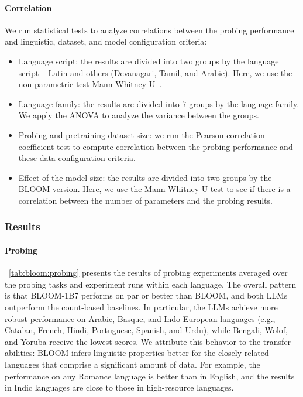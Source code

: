 \paragraph{Correlation} We run statistical tests to analyze correlations between the probing performance and linguistic, dataset, and model configuration criteria:

\begin{itemize}
    \item Language script: the results are divided into two groups by the language script -- Latin and others (Devanagari, Tamil, and Arabic). Here, we use the non-parametric test Mann-Whitney U~\citep{mann1947controlling}.
    \item Language family: the results are divided into $7$ groups by the language family. We apply the ANOVA to analyze the variance between the groups.
    \item Probing and pretraining dataset size: we run the Pearson correlation coefficient test \citep{pearson1895vii} to compute correlation between the probing performance and these data configuration criteria.
    \item Effect of the model size: the results are divided into two groups by the BLOOM version. Here, we use the Mann-Whitney U test to see if there is a correlation between the number of parameters and the probing results.
\end{itemize}

\subsubsection{Results}

\paragraph{Probing} ~\autoref{tab:bloom:probing} presents the results of probing experiments averaged over the probing tasks and experiment runs within each language. The overall pattern is that BLOOM-1B7 performs on par or better than BLOOM, and both LLMs outperform the count-based baselines. In particular, the LLMs achieve more robust performance on Arabic, Basque, and Indo-European languages (e.g., Catalan, French, Hindi, Portuguese, Spanish, and Urdu), while Bengali, Wolof, and Yoruba receive the lowest scores. We attribute this behavior to the transfer abilities: BLOOM infers linguistic properties better for the closely related languages that comprise a significant amount of data. For example, the performance on any Romance language is better than in English, and the results in Indic languages are close to those in high-resource languages.  

